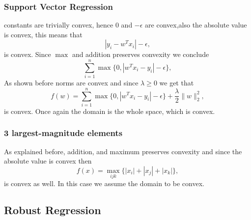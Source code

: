 \documentclass[11pt]{article}
\theoremstyle{plain}
\begin{document}
\subsubsection{Support Vector Regression}
constants are trivially convex, hence $0$ and $-\epsilon$ are convex,also the absolute value is convex, 
this means that 
\begin{equation*}
|y_{i}-w^{T}x_{i}|-\epsilon,
\end{equation*}
is convex. Since $\max$ and addition preserves convexity we conclude 
\begin{equation*}
\sum_{i=1}^{n} \max\{0,|w^{T}x_{i}-y_{i}|-\epsilon\},
\end{equation*}
As shown before norms are convex and since $\lambda\geq 0$ we get that 
\begin{equation*}
f(w)=\sum_{i=1}^{n} \max\{0,|w^{T}x_{i}-y_{i}|-\epsilon\}+\frac{\lambda}{2}\|w\|_{2}^{2},
\end{equation*}
is convex. Once again the domain is the whole space, which is convex.

\subsubsection{3 largest-magnitude elements}
As explained before, addition, and maximum preserves convexity and since the absolute value is convex then
\begin{equation*}
f(x)=\max_{ijk}\{|x_{i}|+|x_{j}|+|x_{k}|\},
\end{equation*}
is convex as well. In this case we assume the domain to be convex.

\newpage
\subsection{Robust Regression}
\end{document}
